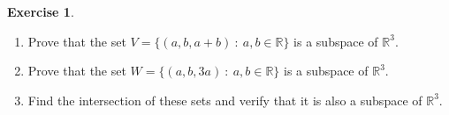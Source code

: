 \documentclass{beamer}
\newcommand{\R}{\mathbb{R}}
\newcommand{\fn}{\insertframenumber}
\theoremstyle{definition}
\newtheorem{exercise}{Exercise}
\newtheorem*{defn}{Definition}
\newtheorem*{exa}{Example}
\renewcommand{\emph}[1]{{\color{blue}\texttt{#1}}}
\begin{document}
\begin{frame}{\fn}
	\begin{exercise}
		\begin{enumerate}[label=(\alph*)]
			\item Prove that the set $V=\{(a,b,a+b)\ :\ a,b\in\R\}$ is a subspace of $\R^3$.  
	
			\item Prove that the set $W=\{(a,b,3a)\ :\ a,b\in\R\}$ is a subspace of $\R^3$.
	
			\item Find the intersection of these sets and verify that it is also a subspace of $\R^3$. 
		\end{enumerate}
	\end{exercise}
\end{frame}
\end{document}
